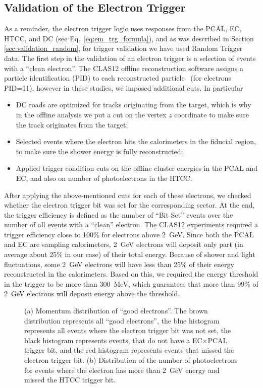 \subsection{Validation of the Electron Trigger}
\label{electron_trigger_validation}

As a reminder, the electron trigger logic uses responses from the PCAL, EC, HTCC, and DC (see
Eq.~\ref{eq:em_trg_formula}), and as was described in Section \ref{sec:validation_random}, for trigger
validation we have used Random Trigger data. The first step in the validation of an electron trigger is a
selection of  events with a ``clean electron''. The CLAS12 offline reconstruction software assigns a particle
identification (PID) to each reconstructed particle~\cite{offline-ref} (for electrons PID=11), however in these
studies, we imposed additional cuts. In particular 
\begin{itemize}
\item DC roads are optimized for tracks originating from the target, which is why in the offline analysis we
  put a cut on the vertex $z$ coordinate to make sure the track originates from the target;
\item Selected events where the electron hits the calorimeters in the fiducial region, to make sure the shower
  energy is fully reconstructed;
\item Applied trigger condition cuts on the offline cluster energies in the PCAL and EC, and also on number of
  photoelectrons in the HTCC.
\end{itemize}
After applying the above-mentioned cuts for each of these electrons, we checked whether the electron trigger
bit was set for the corresponding sector. At the end, the trigger efficiency is defined as the number of
``Bit  Set'' events over the number of all events with a ``clean'' electron. The CLAS12 experiments required
a trigger efficiency close to 100\% for electrons above 2~GeV. Since both the PCAL and EC are sampling
calorimeters, 2~GeV electrons will deposit only part (in average about 25\% in our case) of their total energy.
Because of shower and light fluctuations, some 2~GeV electrons will have less than 25\% of their energy
reconstructed in the calorimeters. Based on this, we required the energy threshold in the trigger to be more
than 300~MeV, which guarantees that more than 99\% of 2~GeV electrons will deposit energy above the
threshold.

\begin{figure}[!htb]
 \centering
 \caption{(a) Momentum distribution of ``good electrons''. The brown distribution represents all
   ``good electrons'', the blue histogram represents all events where the electron trigger bit was not set, the
   black histogram represents events, that do not have a EC$\times$PCAL trigger bit, and the red histogram
   represents events that missed the electron trigger bit. (b) Distribution of the number of photoelectrons for
   events where the electron has more than 2~GeV energy and missed the HTCC trigger bit.}
 \label{fig:em_missed_events}
\end{figure}

